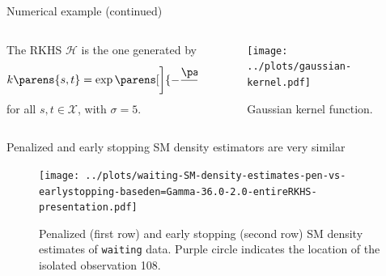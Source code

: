 \documentclass[aspectratio=169,xcolor=dvipsnames]{beamer}
\newcommand{\calX}{\mathcal{X}}
\begin{document}
\begin{frame}{Numerical example (continued)}
	
	\begin{columns}[c]
	    \begin{column}{.5\textwidth}
	    
			The RKHS $\mathcal{H}$ is the one generated by 
			\begin{align*}
				k \parens{s, t} = \exp \parens[\bigg]{-\frac{\parens{s - t}^2}{2 \sigma^2}}, 
			\end{align*}
			for all $s, t \in \calX$, with $\sigma = 5$. 
			
		\end{column}
		
	    \begin{column}{.5\textwidth}

			\begin{figure}
				\centering
				\texttt{[image: ../plots/gaussian-kernel.pdf]}
				\caption{Gaussian kernel function.}
				\label{fig-base-den-log}
			\end{figure}

			
	    \end{column}
	\end{columns}
	
\end{frame}


\begin{frame}{Penalized and early stopping SM density estimators are very similar}

	\begin{figure}
		\centering
		\texttt{[image: ../plots/waiting-SM-density-estimates-pen-vs-earlystopping-baseden=Gamma-36.0-2.0-entireRKHS-presentation.pdf]}
		\caption{Penalized (first row) and early stopping (second row) SM density estimates of \texttt{waiting} data. Purple circle indicates the location of the isolated observation 108.}
		\label{fig-sm-compare}
	\end{figure}
	
\end{frame}


%	
%	
\end{document}
